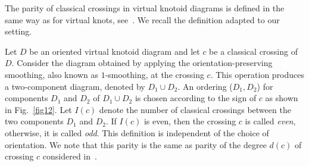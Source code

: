\documentclass[10pt,a4paper]{amsart}
\numberwithin{equation}{section}
\numberwithin{equation}{section}
\begin{document}
The parity of classical crossings in virtual knotoid diagrams is defined in the same way as for virtual knots, see~\cite{Man}. We recall the definition adapted to our setting.

Let $D$ be an oriented virtual knotoid diagram and let $c$ be a classical crossing of $D$. Consider the diagram obtained by applying the orientation-preserving smoothing, also known as  $1$-smoothing, at the crossing $c$. This operation produces a two-component diagram, denoted by $D_1 \cup D_2$. An ordering ($D_1, D_2$) for components $D_1$ and $D_2$ of $D_1 \cup D_2$ is chosen according to the sign of $c$ as shown in Fig.~\ref{fig12}. Let $I(c)$ denote the number of classical crossings between the two components $D_1$ and $D_2$. If $I(c)$ is even, then the crossing $c$ is called \textit{even}, otherwise, it is called \textit{odd}.  This definition is independent of the choice of orientation. We note that this parity is the same as parity of the degree $d(c)$ of crossing $c$ considered in~\cite{FLV}. 
\end{document}
